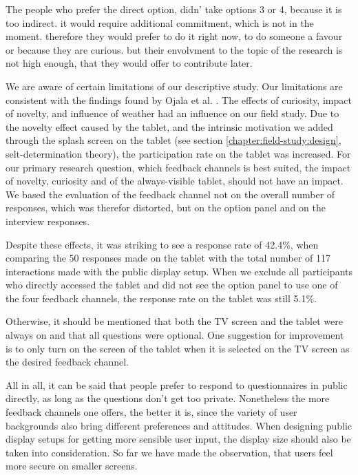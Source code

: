 	The people who prefer the direct option, didn' take options 3 or 4, because it is too indirect. it would require additional commitment, which is not in the moment. therefore they would prefer to do it right now, to do someone a favour or because they are curious. but their envolvment to the topic of the research is not high enough, that they would offer to contribute later.
	




	We are aware of certain limitations of our descriptive study. Our limitations are consistent with the findings found by Ojala et al. \cite{Ojala2011}. The effects of curiosity, impact of novelty, and influence of weather had an influence on our field study. Due to the novelty effect caused by the tablet, and the intrinsic motivation we added through the splash screen on the tablet (see section \ref{chapter:field-study:design}, selt-determination theory), the participation rate on the tablet was increased. For our primary research question, which feedback channels is best suited, the impact of novelty, curiosity and of the always-visible tablet, should not have an impact. We based the evaluation of the feedback channel not on the overall number of responses, which was therefor distorted, but on the option panel and on the interview responses.

	Despite these effects, it was striking to see a response rate of 42.4\%, when comparing the 50 responses made on the tablet with the total number of 117 interactions made with the public display setup. When we exclude all participants who directly accessed the tablet and did not see the option panel to use one of the four feedback channels, the response rate on the tablet was still 5.1\%. 

	Otherwise, it should be mentioned that both the TV screen and the tablet were always on and that all questions were optional. One suggestion for improvement is to only turn on the screen of the tablet when it is selected on the TV screen as the desired feedback channel.



	All in all, it can be said that people prefer to respond to questionnaires in public directly, as long as the questions don't get too private. Nonetheless the more feedback channels one offers, the better it is, since the variety of user backgrounds also bring different preferences and attitudes. When designing public display setups for getting more sensible user input, the display size should also be taken into consideration. So far we have made the observation, that users feel more secure on smaller screens.	

